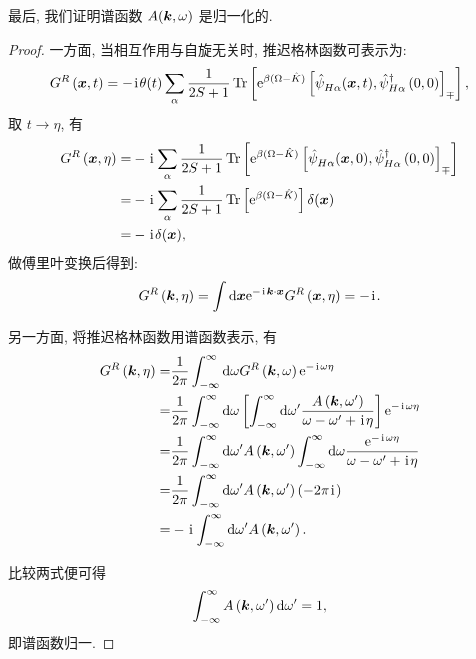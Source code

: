 最后, 我们证明谱函数 $A(\boldsymbol{k}, \omega)$ 是归一化的.
\begin{proof}
一方面, 当相互作用与自旋无关时, 推迟格林函数可表示为:
\begin{equation}
 G^R\left(\boldsymbol{x}, t \right) = - \hspace{0.1em}\mathrm{i}\hspace{0.1em}\theta(t)\sum\limits_{\alpha}\frac{1}{2S+1}\operatorname{Tr}\left[\mathrm{e}^{\beta(\Omega-\hat{K})}\left[\hat{\psi}^{}_{H \alpha}(\boldsymbol{x}, t), \hat{\psi}_{H \alpha}^{\dagger}\left(0,0\right)\right]_{\mp}\right],
\end{equation}
取 $t\to \eta$, 有
\begin{align}
 G^R\left(\boldsymbol{x}, \eta \right) =& - \hspace{0.1em}\mathrm{i}\hspace{0.1em}\sum\limits_{\alpha}\frac{1}{2S+1}\operatorname{Tr}\left[\mathrm{e}^{\beta(\Omega-\hat{K})}\left[\hat{\psi}^{}_{H \alpha}(\boldsymbol{x}, 0), \hat{\psi}_{H \alpha}^{\dagger}\left(0,0\right)\right]_{\mp}\right]\nonumber\\
=&- \hspace{0.1em}\mathrm{i}\hspace{0.1em}\sum\limits_{\alpha}\frac{1}{2S+1}\operatorname{Tr}\left[\mathrm{e}^{\beta(\Omega-\hat{K})}\right] \delta(\boldsymbol{x})\nonumber\\
=&-\hspace{0.1em}\mathrm{i}\hspace{0.1em} \delta(\boldsymbol{x}),
\end{align}
做傅里叶变换后得到:
\begin{equation}
 G^R\left(\boldsymbol{k}, \eta \right)= \int\mathrm{d}\boldsymbol{x}\mathrm{e}^{-\hspace{0.1em}\mathrm{i}\hspace{0.1em}\boldsymbol{k}\cdot\boldsymbol{x}}G^R\left(\boldsymbol{x}, \eta \right)=-\hspace{0.1em}\mathrm{i}\hspace{0.1em}.
\end{equation}

另一方面, 将推迟格林函数用谱函数表示, 有
\begin{align}
 G^R\left(\boldsymbol{k}, \eta \right) =&\frac{1}{2\pi}\int_{-\infty}^{\infty}\mathrm{d}\omega G^R\left(\boldsymbol{k}, \omega \right)\mathrm{e}^{-\hspace{0.1em}\mathrm{i}\hspace{0.1em}\omega\eta}\nonumber\\
=&\frac{1}{2\pi}\int_{-\infty}^{\infty}\mathrm{d}\omega \left[\int_{-\infty}^{\infty} \mathrm{d} \omega^{\prime} \frac{A\left(\boldsymbol{k}, \omega^{\prime}\right)}{\omega-\omega^{\prime}+\hspace{0.1em}\mathrm{i}\hspace{0.1em} \eta}\right]\mathrm{e}^{-\hspace{0.1em}\mathrm{i}\hspace{0.1em}\omega\eta}\nonumber\\
=&\frac{1}{2\pi}\int_{-\infty}^{\infty}\mathrm{d}\omega^{\prime} A\left(\boldsymbol{k}, \omega^{\prime}\right) \int_{-\infty}^{\infty}\mathrm{d} \omega \frac{\mathrm{e}^{-\hspace{0.1em}\mathrm{i}\hspace{0.1em}\omega\eta}}{\omega-\omega^{\prime}+\hspace{0.1em}\mathrm{i}\hspace{0.1em} \eta}\nonumber\\
=&\frac{1}{2\pi}\int_{-\infty}^{\infty}\mathrm{d}\omega^{\prime}A\left(\boldsymbol{k}, \omega^{\prime}\right) (-2\pi \hspace{0.1em}\mathrm{i}\hspace{0.1em})\nonumber\\
=&-\hspace{0.1em}\mathrm{i}\hspace{0.1em}  \int_{-\infty}^{\infty}\mathrm{d}\omega^{\prime} A\left(\boldsymbol{k}, \omega^{\prime}\right).
\end{align}

比较两式便可得
\begin{equation}
 \int_{-\infty}^{\infty} A\left(\boldsymbol{k}, \omega^{\prime}\right)\mathrm{d}\omega^{\prime}=1,
\end{equation}
即谱函数归一.
\end{proof}

